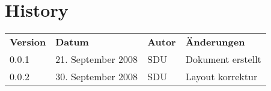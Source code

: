 \section*{History}
\begin{tabular*}{\textwidth}{l l l l}
\toprule
\bf{Version} & \bf{Datum} & \bf{Autor} & \bf{Änderungen} \\
\cmidrule(r){1-1} \cmidrule(lr){2-2} \cmidrule(lr){3-3} \cmidrule(l){4-4}
0.0.1 &21. September 2008 & SDU & Dokument erstellt \\
0.0.2&30. September 2008 & SDU & Layout korrektur \\
\bottomrule
\end{tabular*}

